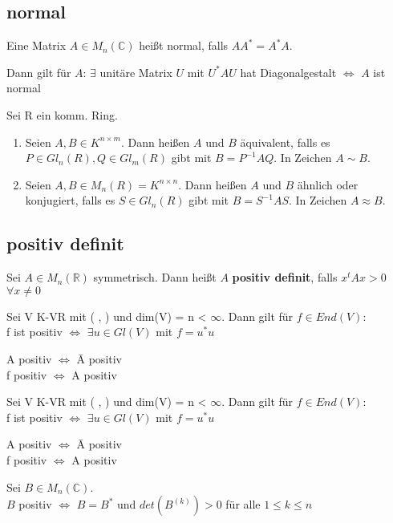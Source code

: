 \subsection{normal}
\begin{definition}
Eine Matrix $A \in M_n(\mathbb{C})$ heißt normal, falls $AA^* = A^*A$.
\end{definition}
\begin{lemma}
Dann gilt für $A$: $\exists$ unitäre Matrix $U$ mit $U^*AU$ hat Diagonalgestalt $\Leftrightarrow$ $A$ ist normal
\end{lemma}
\begin{definition}
Sei R ein komm. Ring.
\begin{enumerate}
	\item Seien $A,B \in K^{n \times m}$. Dann heißen $A$ und $B$ äquivalent, falls es $P \in Gl_n(R), Q \in Gl_m(R)$ gibt mit $B=P^{-1}AQ$. In Zeichen $A \sim B$.
	\item Seien $A,B \in M_n(R) = K^{n \times n}$. Dann heißen $A$ und $B$ ähnlich oder konjugiert, falls es $S \in Gl_n(R)$ gibt mit $B=S^{-1}AS$. In Zeichen $A \approx B$.
\end{enumerate}
\end{definition}

\subsection{positiv definit}
\begin{definition}
Sei $A \in M_n(\mathbb{R})$ symmetrisch. Dann heißt $A$ \textbf{positiv definit}, falls $x^tAx > 0$ $\forall x \neq 0$
\end{definition}
\begin{theorem}
\leavevmode
\begin{compactitem}
\item Sei V K-VR mit ( , ) und dim(V) = n < $\infty$. Dann gilt für $f \in End(V)$:\\
f ist positiv $\Leftrightarrow$ $\exists u \in Gl(V)$ mit $f = u^*u$
\item A positiv $\Leftrightarrow$ \={A} positiv\\
f positiv $\Leftrightarrow$ A positiv

\begin{theorem}
\leavevmode
\begin{compactitem}
\item Sei V K-VR mit ( , ) und dim(V) = n < $\infty$. Dann gilt für $f \in End(V)$:\\
f ist positiv $\Leftrightarrow$ $\exists u \in Gl(V)$ mit $f = u^*u$
\item A positiv $\Leftrightarrow$ \={A} positiv\\
f positiv $\Leftrightarrow$ A positiv
\item Sei $B \in M_n(\mathbb{C})$.\\
$B$ positiv $\Leftrightarrow$ $B = B^*$ und $det(B^{(k)}) > 0$ für alle $1 \le k \le n$
\end{compactitem}
\end{theorem}

\end{compactitem}
\end{theorem}


